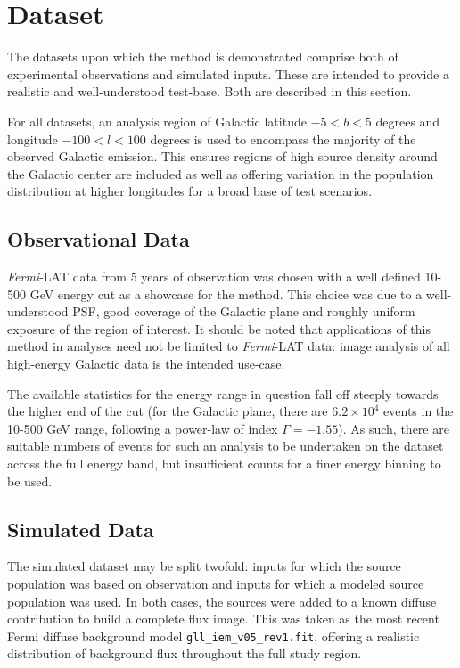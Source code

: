 \documentclass{PoS}
\begin{document}
\section{Dataset}

The datasets upon which the method is demonstrated comprise both of experimental observations and simulated inputs. These are intended to provide a realistic and well-understood test-base. Both are described in this section.

For all datasets, an analysis region of Galactic latitude $-5 < b < 5$ degrees and longitude $-100 < l < 100$ degrees is used to encompass the majority of the observed Galactic emission. This ensures regions of high source density around the Galactic center are included as well as offering variation in the population distribution at higher longitudes for a broad base of test scenarios.


\subsection{Observational Data}

\textit{Fermi}-LAT data from 5 years of observation was chosen with a well defined 10-500 GeV energy cut as a showcase for the method. This choice was due to a well-understood PSF, good coverage of the Galactic plane and roughly uniform exposure of the region of interest. It should be noted that applications of this method in analyses need not be limited to \textit{Fermi}-LAT data: image analysis of all high-energy Galactic data is the intended use-case.

The available statistics for the energy range in question fall off steeply towards the higher end of the cut (for the Galactic plane, there are $6.2 \times 10^4$ events in the 10-500 GeV range, following a power-law of index $\Gamma = -1.55$). As such, there are suitable numbers of events for such an analysis to be undertaken on the dataset across the full energy band, but insufficient counts for a finer energy binning to be used.

\subsection{Simulated Data}

The simulated dataset may be split twofold: inputs for which the source population was based on observation and inputs for which a modeled source population was used. In both cases, the sources were added to a known diffuse contribution to build a complete flux image. This was taken as the most recent Fermi diffuse background model \verb|gll_iem_v05_rev1.fit|, offering a realistic distribution of background flux throughout the full study region.
\end{document}
